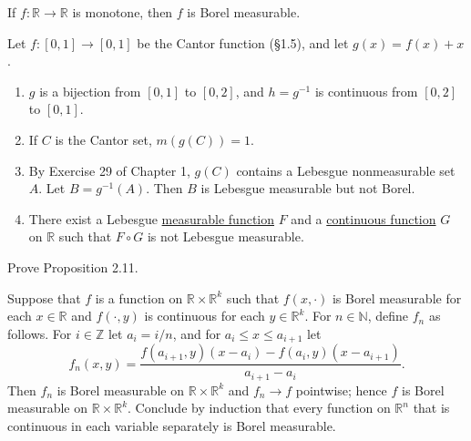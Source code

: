 	\begin{exercise}[Folland 2.8]
		If $f : \mathbb{R} \to \mathbb{R}$ is monotone, then $f$ is Borel measurable.
	\end{exercise}
	\begin{solution}

	\end{solution}

	\begin{exercise}[Folland 2.9]
		Let $f : [0, 1] \to [0, 1]$ be the Cantor function (\S 1.5), and let $g(x) = f(x) + x$.
		\begin{enumerate}[label=\textbf{\alph*.}]
			\item $g$ is a bijection from $[0, 1]$ to $[0, 2]$, and $h = g^{-1}$ is continuous from $[0, 2]$ to $[0, 1]$.
			\item If $C$ is the Cantor set, $m(g(C)) = 1$.
			\item By Exercise 29 of Chapter 1, $g(C)$ contains a Lebesgue nonmeasurable set $A$. Let $B = g^{-1}(A)$. Then $B$ is Lebesgue measurable but not Borel.
			\item There exist a Lebesgue \hyperref[def:measurable-function]{measurable function} $F$ and a \hyperref[pst-def:continuous_func]{continuous function} $G$ on $\mathbb{R}$ such that $F \circ G$ is not Lebesgue measurable.
		\end{enumerate}
	\end{exercise}
	\begin{solution}

	\end{solution}

	\begin{exercise}[Folland 2.10]
		Prove Proposition 2.11.
	\end{exercise}
	\begin{solution}

	\end{solution}

	\begin{exercise}[Folland 2.11]
		Suppose that $f$ is a function on $\mathbb{R} \times \mathbb{R}^k$ such that $f(x, \cdot)$ is Borel measurable for each $x \in \mathbb{R}$ and $f(\cdot, y)$ is continuous for each $y \in \mathbb{R}^k$. For $n \in \mathbb{N}$, define $f_n$ as follows. For $i \in \mathbb{Z}$ let $a_i = i/n$, and for $a_i \le x \le a_{i+1}$ let
		\begin{equation}
			f_n(x, y) = \frac{f(a_{i+1}, y)(x - a_i) - f(a_i, y)(x - a_{i+1})}{a_{i+1} - a_i}.
		\end{equation}
		Then $f_n$ is Borel measurable on $\mathbb{R} \times \mathbb{R}^k$ and $f_n \to f$ pointwise; hence $f$ is Borel measurable on $\mathbb{R} \times \mathbb{R}^k$. Conclude by induction that every function on $\mathbb{R}^n$ that is continuous in each variable separately is Borel measurable.
	\end{exercise}
	\begin{solution}

	\end{solution}

